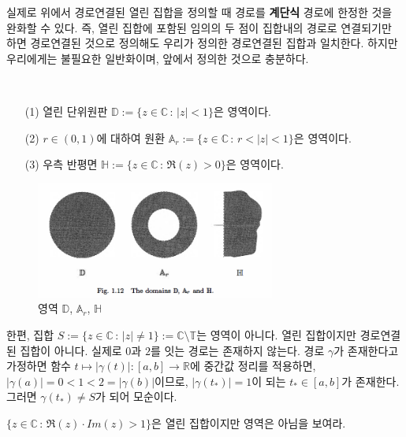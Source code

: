 실제로 위에서 경로연결된 열린 집합을 정의할 때 경로를 {\bf 계단식} 경로에 한정한 것을 
완화할 수 있다. 즉, 열린 집합에 포함된 임의의 두 점이 집합내의 경로로 연결되기만 하면
경로연결된 것으로 정의해도
우리가 정의한 경로연결된 집합과 일치한다.
하지만 우리에게는 불필요한 일반화이며, 앞에서 정의한 것으로 충분하다.

\begin{salt_example} \label{example-1-3}
\
\begin{itemize}
\item[(1)] 열린 단위원판 $\mathbb D := \{ z\in\mathbb C\,:\, |z|<1 \}$은 영역이다.
\item[(2)] $r\in (0,1)$에 대하여 원환 $\mathbb A_r := \{ z\in\mathbb C\,:\, r<|z|<1\}$은 영역이다.
\item[(3)] 우측 반평면 $\mathbb H := \{ z\in \mathbb C \,:\, \Re(z)>0\}$은 영역이다.
\end{itemize}

\begin{figure}[!h]
\begin{center}
\includegraphics[width=0.7\textwidth]{./SaltChapter/fig-1-12}
\end{center}
\caption{영역 $\mathbb D$, $\mathbb A_r$, $\mathbb H$}
\label{fig-1-12}
\end{figure}
\end{salt_example}

한편, 집합 $S:=\{z\in\mathbb C \,:\, |z|\ne 1\} := \mathbb C\setminus \mathbb T$는 
영역이 아니다. 열린 집합이지만 경로연결된 집합이 아니다.
실제로 $0$과 $2$를 잇는 경로는 존재하지 않는다.
경로 $\gamma$가 존재한다고 가정하면
함수 $t\mapsto |\gamma(t)| : [a,b] \to \mathbb R$에
중간값 정리를 적용하면,
$|\gamma(a)| = 0 < 1<2 = |\gamma(b)|$이므로,
$|\gamma(t_*)|=1$이 되는 $t_*\in [a,b]$가 존재한다.
그러면 $\gamma(t_*)\ne S$가 되어 모순이다.

\begin{salt_exercise} \label{ex-1-29}
$\{z\in \mathbb C \,:\, \Re(z) \cdot Im(z) >1\}$은 열린 집합이지만
영역은 아님을 보여라.
\end{salt_exercise}


